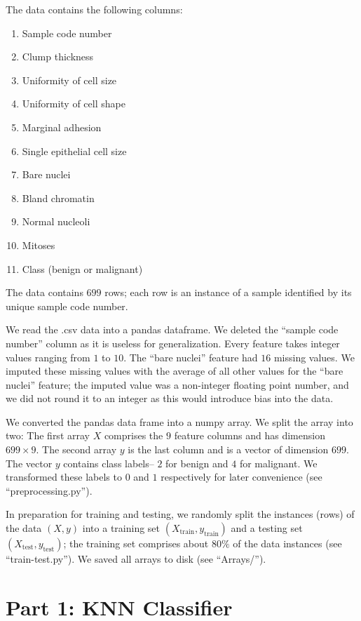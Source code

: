 \documentclass[12pt]{article}
\newcommand{\Xtrain}{X_{\mbox{train}}}
\newcommand{\ytrain}{y_{\mbox{train}}}
\newcommand{\Xtest}{X_{\mbox{test}}}
\newcommand{\ytest}{y_{\mbox{test}}}
\begin{document}
The data contains the following columns:
\begin{enumerate}
\item Sample code number
\item Clump thickness
\item Uniformity of cell size
\item Uniformity of cell shape
\item Marginal adhesion
\item Single epithelial cell size
\item Bare nuclei
\item Bland chromatin
\item Normal nucleoli
\item Mitoses
\item Class (benign or malignant)
\end{enumerate}
The data contains $699$ rows; each row is an instance of a sample identified by its unique sample code number.

We read the .csv data into a pandas dataframe. We deleted the ``sample code number'' column as it is useless for generalization. Every feature takes integer values ranging from $1$ to $10$. The ``bare nuclei'' feature had $16$ missing values. We imputed these missing values with the average of all other values for the ``bare nuclei'' feature; the imputed value was a non-integer floating point number, and we did not round it to an integer as this would introduce bias into the data.

We converted the pandas data frame into a numpy array. We split the array into two: The first array $X$ comprises the $9$ feature columns and has dimension $699\times 9$. The second array $y$ is the last column and is a vector of dimension $699$. The vector $y$ contains class labels-- $2$ for benign and $4$ for malignant. We transformed these labels to $0$ and $1$ respectively for later convenience (see ``preprocessing.py'').

In preparation for training and testing, we randomly split the instances (rows) of the data $(X, y)$ into a training set $(\Xtrain, \ytrain)$ and a testing set $(\Xtest, \ytest)$; the training set comprises about $80\%$ of the data instances (see ``train-test.py''). We saved all arrays to disk (see ``Arrays/'').

\section{Part 1: KNN Classifier}
\end{document}
